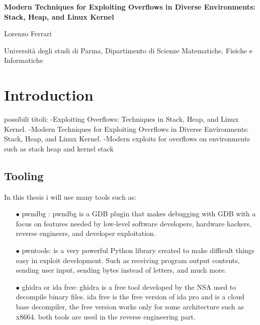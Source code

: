 \documentclass{report}
\begin{document}
\begin{titlepage}
    \centering
    \vspace*{\fill}
    \Huge \textbf{Modern Techniques for Exploiting Overflows in Diverse Environments: Stack, Heap, and Linux Kernel}
    \vspace{2cm} 
    
    \Large Lorenzo Ferrari


    \vspace{2cm} %
    
    \Large Università degli studi di Parma, Dipartimento di Scienze Matematiche, Fisiche e Informatiche

    
 
\end{titlepage}
\newpage

\mbox{} %
\newpage

\renewcommand{\contentsname}{Index}
\tableofcontents
    
    
    
    \chapter{Introduction}
    possibili titoli: \newline
    -Exploiting Overflows: Techniques in Stack, Heap, and Linux Kernel.
    -Modern Techniques for Exploiting Overflows in Diverse Environments: Stack, Heap, and Linux Kernel.
    -Modern exploits for overflows on environments such as stack heap and kernel stack
    
    \section{Tooling}
    In this thesis i will use many tools such as: 
       \begin{itemize}
        \item[$\bullet$] pwndbg : pwndbg is a GDB plugin that makes debugging with GDB with a focus on features needed by low-level software developers, hardware hackers, reverse engineers, and developer exploitation.\newline
        \item[$\bullet$]pwntools: is a very powerful Python library created to make difficult things easy in exploit development.\newline
        Such as receiving program output contents, sending user input, sending bytes instead of letters, and much more.\newline
        \item[$\bullet$] ghidra or ida free: 
        ghidra is a free tool developed by the NSA used to decompile binary files.
        ida free is the free version of ida pro and is a cloud base decompiler, the free version works only for some architecture such as x8664.\newline
        both tools are used in the reverse engineering part.\newline
    \end{itemize}
    
\end{document}

